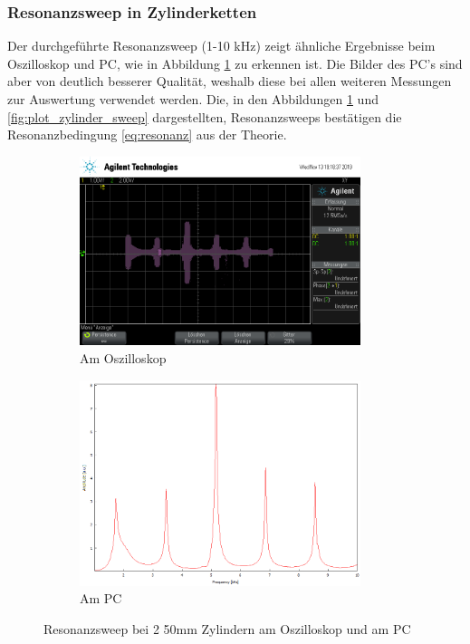 \subsubsection{Resonanzsweep in Zylinderketten}
Der durchgeführte Resonanzsweep (1-10 kHz) zeigt ähnliche Ergebnisse beim Oszilloskop und PC, wie in Abbildung \ref{fig:plot_2zylinder_sweep} zu erkennen ist.
Die Bilder des PC's sind aber von deutlich besserer Qualität, weshalb diese bei allen weiteren Messungen zur Auswertung verwendet werden.
Die, in den Abbildungen \ref{fig:plot_2zylinder_sweep} und \ref{fig:plot_zylinder_sweep} dargestellten, Resonanzsweeps bestätigen die Resonanzbedingung \eqref{eq:resonanz} aus der Theorie.
\begin{figure}
  \centering
  \begin{subfigure}{0.48\textwidth}
    \centering
    \includegraphics[width=0.9\textwidth]{Bilder/Oszillator_Zylindermessung/scope_0.png}
    \caption{Am Oszilloskop}
  \end{subfigure}
  \begin{subfigure}{0.48\textwidth}
    \centering
    \includegraphics[width=0.9\textwidth]{Bilder/PC_Zylindermessung/2_Zylinder.png}
    \caption{Am PC}
  \end{subfigure}
  \caption{Resonanzsweep bei 2 50mm Zylindern am Oszilloskop und am PC}
  \label{fig:plot_2zylinder_sweep}
\end{figure}

